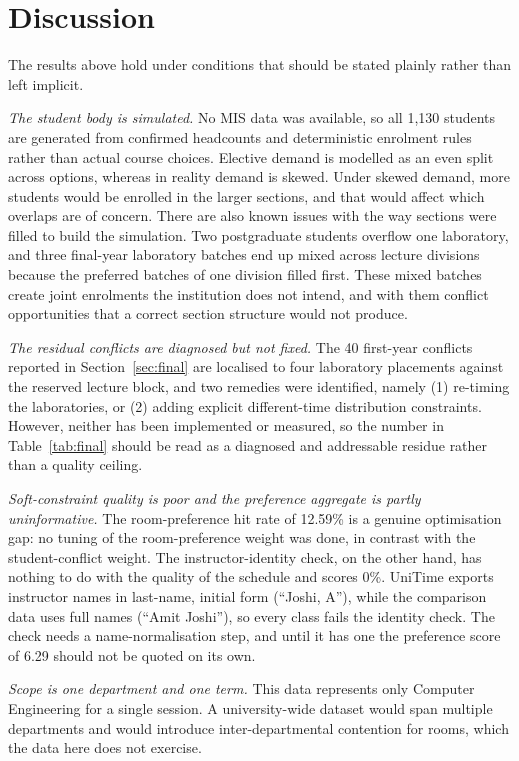 \documentclass[journal]{IEEEtran}
\begin{document}
\section{Discussion}
\label{sec:discussion}

The results above hold under conditions that should be stated plainly rather than left implicit.

\emph{The student body is simulated.} No MIS data was available, so all 1{,}130 students are generated from confirmed headcounts and deterministic enrolment rules rather than actual course choices. Elective demand is modelled as an even split across options, whereas in reality demand is skewed. Under skewed demand, more students would be enrolled in the larger sections, and that would affect which overlaps are of concern. There are also known issues with the way sections were filled to build the simulation. Two postgraduate students overflow one laboratory, and three final-year laboratory batches end up mixed across lecture divisions because the preferred batches of one division filled first. These mixed batches create joint enrolments the institution does not intend, and with them conflict opportunities that a correct section structure would not produce.

\emph{The residual conflicts are diagnosed but not fixed.} The 40 first-year conflicts reported in Section~\ref{sec:final} are localised to four laboratory placements against the reserved lecture block, and two remedies were identified, namely (1) re-timing the laboratories, or (2) adding explicit different-time distribution constraints. However, neither has been implemented or measured, so the number in Table~\ref{tab:final} should be read as a diagnosed and addressable residue rather than a quality ceiling.

\emph{Soft-constraint quality is poor and the preference aggregate is partly uninformative.} The room-preference hit rate of 12.59\% is a genuine optimisation gap: no tuning of the room-preference weight was done, in contrast with the student-conflict weight. The instructor-identity check, on the other hand, has nothing to do with the quality of the schedule and scores 0\%. UniTime exports instructor names in last-name, initial form (``Joshi, A''), while the comparison data uses full names (``Amit Joshi''), so every class fails the identity check. The check needs a name-normalisation step, and until it has one the preference score of 6.29 should not be quoted on its own.

\emph{Scope is one department and one term.} This data represents only Computer Engineering for a single session. A university-wide dataset would span multiple departments and would introduce inter-departmental contention for rooms, which the data here does not exercise.
\end{document}
